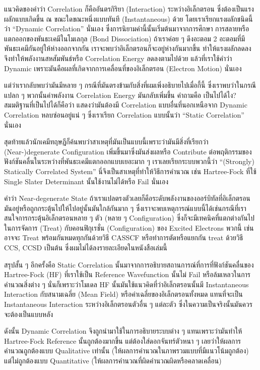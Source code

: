 แนวคิดของคำว่า Correlation ก็คืออันตรกิริยา (Interaction) ระหว่างอิเล็กตรอน ซึ่งต้องเป็นแรงผลักแบบเกิดขึ้น ณ ขณะใดขณะหนึ่งแบบทันที 
(Instantaneous) ด้วย โดยเราเรียกแรงผลักชนิดนี้ว่า \enquote{Dynamic Correlation} นั่นเอง ซึ่งการนิยามคำนี้นั้นเริ่มต้นมาจากการศึกษา%
การสลายหรือแตกออกของพันธะเคมีในโมเลกุล (Bond Dissociation) ถ้าเราค่อย ๆ ดึงอะตอม 2 อะตอมที่มีพันธะเคมีกันอยู่ให้ห่างออกจากกัน
เราจะพบว่าอิเล็กตรอนก็จะอยู่ห่างกันมากขึ้น ทำให้แรงผลักลดลง จึงทำให้พลังงานสหสัมพันธ์หรือ Correlation Energy ลดลงตามไปด้วย 
แล้วที่เราใช้คำว่า Dynamic เพราะมันคือผลที่เกิดจากการเคลื่อนที่ของอิเล็กตรอน (Electron Motion) นั่นเอง

แต่ว่าเรากลับพบว่ามันมีหลาย ๆ กรณีที่มันตรงข้ามกับสิ่งที่ผมเพิ่งอธิบายไปเมื่อกี้นี้ ซึ่งเราพบว่าในกรณีแปลก ๆ พวกนั้นค่าพลังงาน Correlation Energy
มันกลับเพิ่มขึ้น คำถามคือ เป็นไปได้ไง? สมมติฐานที่เป็นไปได้ก็คือว่า แสดงว่ามันต้องมี Correlation แบบอื่นที่นอกเหนือจาก Dynamic Correlation 
หลบซ่อนอยู่แน่ ๆ ซึ่งเราเรียก Correlation แบบนั้นว่า \enquote{Static Correlation} นั่นเอง

สุดท้ายแล้วนักเคมีทฤษฎีก็ค้นพบว่าสาเหตุที่มันเป็นแบบนี้เพราะว่ามันมีสิ่งที่เรียกว่า (Near-)degenerate Configuration เพิ่มขึ้นมาซึ่งมันส่งผลหรือ
Contribute ต่อพฤติกรรมของฟังก์ชันคลื่นในระหว่างที่พันธะเคมีแตกออกแบบเยอะมาก ๆ เราเลยเรียกระบบพวกนี้ว่า \enquote{(Strongly) Statically 
Correlated System} นี่จึงเป็นสาเหตุที่ทำให้วิธีการคำนวณ เช่น Hartree-Fock ที่ใช้ Single Slater Determinant นั้นใช้งานไม่ได้หรือ
Fail นั่นเอง

คำว่า Near-degenerate State ถ้าเราแปลตรงตัวเลยก็คือระดับพลังงานของออร์บิทัลที่อิเล็กตรอนมันอยู่หรือถูกกระตุ้นไปให้ไปอยู่นั้นมันใกล้กันมาก ๆ
ซึ่งเราจะพบเหตุการณ์แบบนี้ได้เช่นกรณีที่เราสนใจการกระตุ้นอิเล็กตรอนหลาย ๆ ตัว (หลาย ๆ Configuration) ซึ่งก็จะมีเทคนิคที่แตกต่างกันไป%
ในการจัดการ (Treat) กับคอนฟิกุเรชั่น (Configuration) ของ Excited Electrons พวกนี้ เช่นอาจจะ Treat พร้อมกันหมดทุกกันด้วยวิธี 
CASSCF หรือทำการตัดหรือแยกกัน treat ด้วยวิธี CCS, CCSD เป็นต้น ซึ่งผมไม่ได้ลงรายละเอียดในหนังสือเล่มนี้

สรุปสั้น ๆ อีกครั้งคือ Static Correlation นั้นมาจากการอธิบายสถานการณ์ที่การที่ฟังก์ชันคลื่นของ Hartree-Fock (HF) ที่เราใช้เป็น Reference
Wavefunction นั้นไม่ Fail หรือล้มเหลวในการคำนวณสิ่งต่าง ๆ นั่นก็เพราะว่าโมเดล HF นั้นมันใช้แนวคิดที่ว่าอิเล็กตรอนนั้นมี Instantaneous
Interaction กับสนามเฉลี่ย (Mean Field) หรือค่าเฉลี่ยของอิเล็กตรอนทั้งหมด แทนที่จะเป็น Instantaneous Interaction
ระหว่างอิเล็กตรอนตัวอื่น ๆ แต่ละตัว ซึ่งในความเป็นจริงนั้นมันควรจะต้องเป็นแบบหลัง

ดังนั้น Dynamic Correlation จึงถูกนำมาใช้ในการอธิบายระบบต่าง ๆ แทนเพราะว่ามันทำให้ Hartree-Fock Reference นั้นถูกต้องมากขึ้น
แต่ต้องใส่ดอกจันทร์ตัวหนา ๆ เลยว่าให้ผลการคำนวณถูกต้องแบบ Qualitative เท่านั้น (ให้ผลการคำนวณในภาพรวมแบบที่มีแนวโน้มถูกต้อง)
แต่ไม่ถูกต้องแบบ Quantitative (ให้ผลการคำนวณที่ผิดคำนวณผิดหรือคลาดเคลื่อน)

